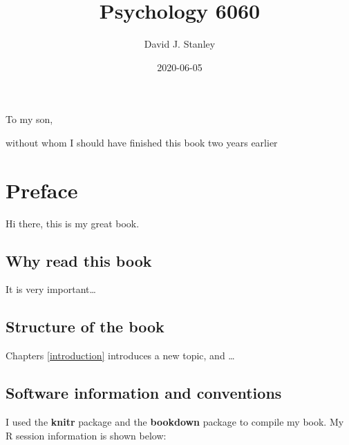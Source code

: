 \documentclass[
]{krantz}
\title{Psychology 6060}
\author{David J. Stanley}
\date{2020-06-05}
\begin{document}
\maketitle


\thispagestyle{empty}

\begin{center}
To my son,

without whom I should have finished this book two years earlier
\end{center}

\setlength{\abovedisplayskip}{-5pt}
\setlength{\abovedisplayshortskip}{-5pt}

{
\hypersetup{linkcolor=}
\setcounter{tocdepth}{2}
\tableofcontents
}
\listoftables
\listoffigures
\hypertarget{preface}{%
\chapter*{Preface}\label{preface}}


Hi there, this is my great book.

\hypertarget{why-read-this-book}{%
\section*{Why read this book}\label{why-read-this-book}}


It is very important\ldots{}

\hypertarget{structure-of-the-book}{%
\section*{Structure of the book}\label{structure-of-the-book}}


Chapters \ref{introduction} introduces a new topic, and \ldots{}

\hypertarget{software-information-and-conventions}{%
\section*{Software information and conventions}\label{software-information-and-conventions}}


I used the \textbf{knitr} package \citep{xie2015} and the \textbf{bookdown} package \citep{R-bookdown} to compile my book. My R session information is shown below:
\end{document}
